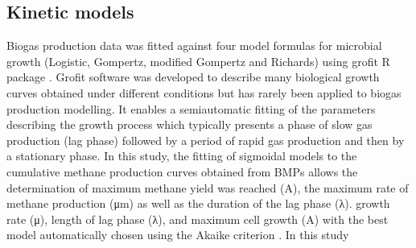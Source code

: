 \subsection{Kinetic models}
Biogas production data was fitted against four model formulas for microbial growth (Logistic, Gompertz, modified Gompertz and Richards) using grofit R package \cite{Kahm_2010}. Grofit software was developed to describe many biological growth curves obtained under different conditions but has rarely been applied to biogas production modelling. It enables a semiautomatic fitting of the parameters describing the growth process which typically presents a phase of slow gas production (lag phase) followed by a period of rapid gas production and then by a stationary phase. In this study, the fitting of sigmoidal models to the cumulative methane production curves obtained from BMPs allows the determination of maximum methane yield was reached (A), the maximum rate of methane production (μm) as well as the duration of the lag phase (λ). growth rate (μ), length of lag phase (λ), and maximum cell growth (A) with the best model automatically chosen using the Akaike criterion \cite{Hasenbrink_2006}. In this study